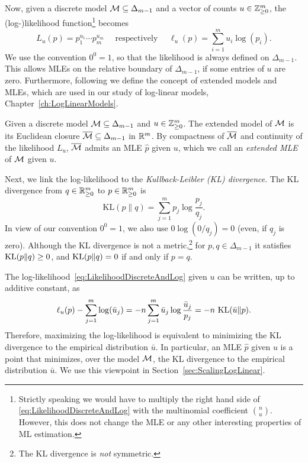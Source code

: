 Now, given a discrete model $\mathcal{M} \subseteq \Delta_{m-1}$ and a vector of counts $u \in \mathbb Z^m_{\geq 0}$,
the (log-)likelihood function\footnote{Strictly speaking we would have to multiply the right hand side of \eqref{eq:LikelihoodDiscreteAndLog} with the multinomial coefficient $\binom{n}{u}$. However, this does not change the MLE or any other interesting properties of ML estimation.}
becomes
\begin{equation}\label{eq:LikelihoodDiscreteAndLog} %
	L_u(p) =  p_1^{u_1} \cdots p_m^{u_m} \quad \text{ respectively } \quad
	\ell_u(p) = \sum_{i=1}^{m} u_i \log(p_i) .
\end{equation}
We use the convention $0^0 = 1$, so that the likelihood is always defined on $\Delta_{m-1}$.
This allows MLEs on the relative boundary of $\Delta_{m-1}$, if some entries of $u$ are zero.
Furthermore, following \cite[Section~4.2.3]{LauritzenBook} we define the concept of extended models and MLEs, which are used in our study of log-linear models, Chapter~\ref{ch:LogLinearModels}.

\begin{defn} \label{defn:ExtendedMLE}
	Given a discrete model $\mathcal{M} \subseteq \Delta_{m-1}$ and $u \in \mathbb Z^m_{\geq 0}$. The extended model of $\mathcal{M}$ is its Euclidean closure $\overline{\mathcal{M}} \subseteq \Delta_{m-1}$ in $\mathbb R^m$. By compactness of $\overline{\mathcal{M}}$ and continuity of the likelihood $L_u$, $\overline{\mathcal{M}}$ admits an MLE $\hat{p}$ given $u$, which we call an \emph{extended MLE} of $\mathcal{M}$ given $u$.
	\hfill{}
\end{defn}

Next, we link the log-likelihood to the \emph{Kullback-Leibler (KL) divergence}.
The KL divergence from $q \in \mathbb R_{\geq 0}^m$ to $p \in \mathbb R_{\geq 0}^m$ is
\[\mathrm{KL}(p\|q) = \sum_{j=1}^m p_j \log \frac{p_j}{q_j}.\]
In view of our convention $0^0 = 1$, we also use $0 \log(0/q_j) = 0$ (even, if $q_j$ is zero).
Although the KL divergence is not a metric,\footnote{The KL divergence is \emph{not} symmetric.}
for $p,q \in \Delta_{m-1}$ it satisfies $\operatorname{KL}(p\|q)\geq 0$, and $\operatorname{KL}(p\|q)=0$ if and only if $p=q$.

The log-likelihood~\eqref{eq:LikelihoodDiscreteAndLog} given $u$ can be written, up to additive constant, as
	\begin{equation}\label{eq:LogLikelihoodDiscreteKL}
		\ell_u(p) - \sum_{j=1}^m \log(\bar{u}_j) = -n \sum_{j=1}^m \bar{u}_j \log \frac{\bar{u}_j}{p_j} = -n \, \operatorname{KL}(\bar{u} \|p).
	\end{equation}
Therefore, maximizing the log-likelihood is equivalent to minimizing the KL divergence to the empirical distribution $\bar{u}$.
In particular, an MLE $\hat{p}$ given $u$ is a point that minimizes, over the model $\mathcal{M}$, the KL divergence to the empirical distribution $\bar{u}$. We use this viewpoint in Section~\ref{sec:ScalingLogLinear}.

